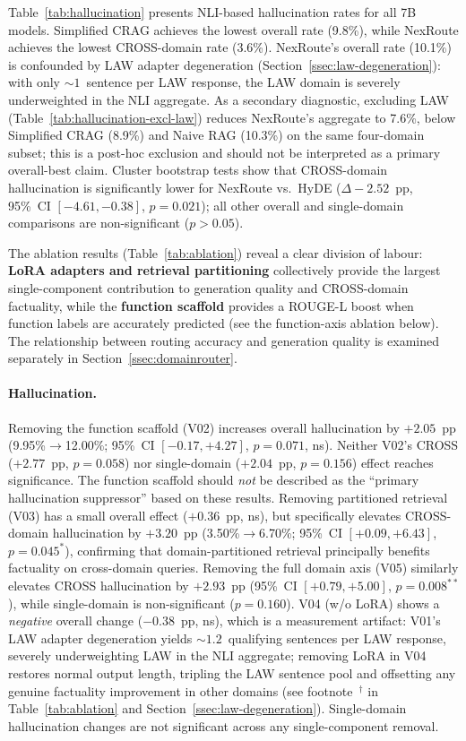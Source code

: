 \documentclass[a4paper,fleql]{cas-sc}
\begin{document}
Table~\ref{tab:hallucination} presents NLI-based hallucination rates for all 7B models.
Simplified CRAG achieves the lowest overall rate (9.8\%), while NexRoute achieves the
lowest CROSS-domain rate (3.6\%).
NexRoute's overall rate (10.1\%) is confounded by LAW adapter degeneration
(Section~\ref{ssec:law-degeneration}): with only ${\sim}1$~sentence per LAW response,
the LAW domain is severely underweighted in the NLI aggregate.
As a secondary diagnostic, excluding LAW (Table~\ref{tab:hallucination-excl-law})
reduces NexRoute's aggregate to 7.6\%, below Simplified CRAG (8.9\%) and Naive RAG
(10.3\%) on the same four-domain subset; this is a post-hoc exclusion and should
not be interpreted as a primary overall-best claim.
Cluster bootstrap tests show that CROSS-domain hallucination is significantly lower
for NexRoute vs.\ HyDE ($\Delta{-}2.52$~pp, 95\%~CI $[-4.61,{-}0.38]$, $p{=}0.021$);
all other overall and single-domain comparisons are non-significant ($p{>}0.05$).

The ablation results (Table~\ref{tab:ablation}) reveal a clear division of labour:
\textbf{LoRA adapters and retrieval partitioning} collectively provide the largest
single-component contribution to generation quality and CROSS-domain factuality,
while the \textbf{function scaffold} provides a ROUGE-L boost when function labels are
accurately predicted (see the function-axis ablation below).
The relationship between routing accuracy and generation quality is examined
separately in Section~\ref{ssec:domainrouter}.

\paragraph{Hallucination.}
Removing the function scaffold (V02) increases overall hallucination by $+2.05$~pp
(9.95\%$\to$12.00\%; 95\%~CI $[-0.17,{+}4.27]$, $p{=}0.071$, \textsf{ns}).
Neither V02's CROSS ($+2.77$~pp, $p{=}0.058$) nor single-domain ($+2.04$~pp,
$p{=}0.156$) effect reaches significance.
The function scaffold should \emph{not} be described as the ``primary hallucination
suppressor'' based on these results.
Removing partitioned retrieval (V03) has a small overall effect ($+0.36$~pp, \textsf{ns}),
but specifically elevates CROSS-domain hallucination by $+3.20$~pp
(3.50\%$\to$6.70\%; 95\%~CI $[{+}0.09,{+}6.43]$, $p{=}0.045^{*}$), confirming
that domain-partitioned retrieval principally benefits factuality on cross-domain queries.
Removing the full domain axis (V05) similarly elevates CROSS hallucination
by $+2.93$~pp (95\%~CI $[{+}0.79,{+}5.00]$, $p{=}0.008^{**}$), while single-domain
is non-significant ($p{=}0.160$).
V04 (w/o LoRA) shows a \textit{negative} overall change ($-0.38$~pp, \textsf{ns}), which is
a measurement artifact: V01's LAW adapter degeneration yields ${\sim}1.2$~qualifying
sentences per LAW response, severely underweighting LAW in the NLI aggregate;
removing LoRA in V04 restores normal output length, tripling the LAW sentence pool
and offsetting any genuine factuality improvement in other domains
(see footnote~$^\dagger$ in Table~\ref{tab:ablation} and Section~\ref{ssec:law-degeneration}).
Single-domain hallucination changes are not significant across any single-component removal.
\end{document}
